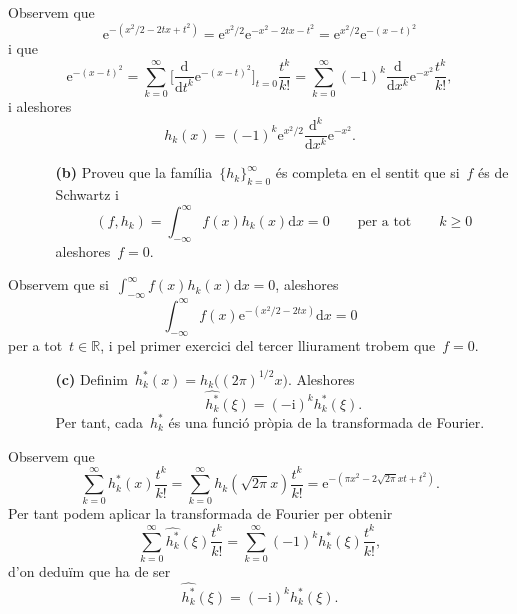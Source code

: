 \documentclass[a4paper]{article}
\theoremstyle{plain}
\theoremstyle{definition}
\newcommand{\iu}{\mathrm{i}}
\newcommand{\e}{\mathrm{e}}
\providecommand{\uppi}{\pi}
\newcommand{\diff}{\mathrm{d}}
\newcommand{\conv}{\mathop{\ast}}
\newcommand{\RR}{\mathbb{R}}
\begin{document}
Observem que
\[
    \e^{-(x^{2}/2 - 2tx+t^{2})}
    =
    \e^{x^{2}/2}
    \e^{-x^{2}-2tx-t^{2}}
    =
    \e^{x^{2}/2}
    \e^{-(x-t)^{2}}
\]
i que
\[
    \e^{-(x-t)^{2}}
    =
    \sum_{k=0}^{\infty}
    \biggl[
        \frac{\diff}{\diff t^{k}}
        \e^{-(x-t)^{2}}
    \biggr]_{t=0}
    \frac{t^{k}}{k!}
    =
    \sum_{k=0}^{\infty}
    (-1)^{k}
    \frac{\diff}{\diff x^{k}}
    \e^{-x^{2}}
    \frac{t^{k}}{k!},
\]
i aleshores
\[
    h_{k}(x)
    =
    (-1)^{k} \e^{x^{2}/2}
    \frac{\diff^{k}}{\diff x^{k}}
    \e^{-x^{2}}.
\]

\begin{enumerate}
    \item[]\begin{enumerate}
        \item[\textbf{(b)}] Proveu que la família~\(\{h_{k}\}_{k=0}^{\infty}\)
            és completa en el sentit que si~\(f\) és de Schwartz i
            \[
                (f,h_{k}) = \int_{-\infty}^{\infty}f(x)h_{k}(x)\diff x = 0
                \qquad\text{per a tot}\qquad
                k\geq0
            \]
            aleshores~\(f=0\).
    \end{enumerate}
\end{enumerate}

Observem que si~\(\int_{-\infty}^{\infty}f(x)h_{k}(x)\diff x=0\), aleshores
\[
    \int_{-\infty}^{\infty}
    f(x)
    \e^{-(x^{2}/2-2tx)}
    \diff x
    =
    0
\]
per a tot~\(t\in\RR\), i pel primer exercici del tercer lliurament trobem
que~\(f=0\).

\begin{enumerate}
    \item[]\begin{enumerate}
        \item[\textbf{(c)}]
            Definim~\(h^{\conv}_{k}(x)=h_{k}\bigl((2\uppi)^{1/2}x\bigr)\).
            Aleshores
            \[
                \widehat{h^{\conv}_{k}}(\xi) = (-\iu)^{k}h_{k}^{\conv}(\xi).
            \]
            Per tant, cada~\(h^{\conv}_{k}\) és una funció pròpia de la
            transformada de Fourier.
    \end{enumerate}
\end{enumerate}

Observem que
\[
    \sum_{k=0}^{\infty}
    h^{\ast}_{k}(x)
    \frac{t^{k}}{k!}
    =
    \sum_{k=0}^{\infty}
    h_{k}(\sqrt{2\uppi}x)
    \frac{t^{k}}{k!}
    =
    \e^{-(\uppi x^{2}-2\sqrt{2\uppi}xt+t^{2})}.
\]
Per tant podem aplicar la transformada de Fourier per obtenir
\[
    \sum_{k=0}^{\infty}
    \widehat{h^{\ast}_{k}}(\xi)
    \frac{t^{k}}{k!}
    =
    \sum_{k=0}^{\infty}
    (-1)^{k}
    h^{\ast}_{k}(\xi)
    \frac{t^{k}}{k!},
\]
d'on deduïm que ha de ser
\[
    \widehat{h^{\conv}_{k}}(\xi) = (-\iu)^{k}h_{k}^{\conv}(\xi).
\]
\end{document}
